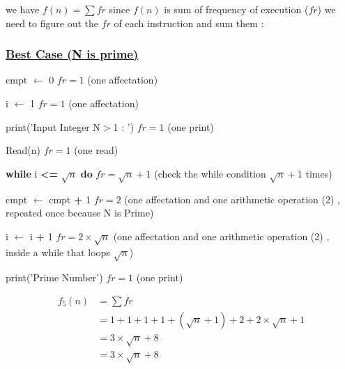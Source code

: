 we have \(f(n) = \sum fr\) since \(f(n)\) is sum of frequency of execution (\(fr\)) we need to figure out the
\(fr\) of each instruction and sum them : 

\subsubsection*{\underline{Best Case (N is prime)}}

\vspace{0.5cm}
cmpt $\gets$ 0  \hspace{4cm} \(fr = 1\) (one affectation)

\vspace{0.15cm}
i $\gets$ 1  \hspace{4.65cm} \(fr = 1\) (one affectation)

\vspace{0.15cm}
\textcolor{purplePlot!80!black}{print}(\textcolor{blueArea!60!black}{'Input Integer N\(>\)1 : '})  \hspace{0.95cm} \(fr = 1\) (one print)

\vspace{0.15cm}
\textcolor{purplePlot!80!black}{Read}(n)  \hspace{4.25cm} \(fr = 1\) (one read)

\vspace{0.15cm}

\textbf{while} i \textcolor{redPlot}{\textbf{\textless=}} \(\sqrt{n}\)  \textbf{do} \hspace{2.45cm} \(fr = \sqrt{n}+1\) (check the while condition \(\sqrt{n}+1\) times)


\vspace{0.15cm}
cmpt $\gets$ cmpt \textcolor{redPlot}{ \textbf{+}} 1 \hspace{2.6cm} \(fr = 2\) (one affectation and one arithmetic operation (2) , repeated once because N is Prime)

\vspace{0.15cm}
i $\gets$ i \textcolor{redPlot}{ \textbf{+}} 1 \hspace{3.95cm} \(fr = 2\times\sqrt{n}\) (one affectation and one arithmetic operation (2) , inside a while that loops \(\sqrt{n}\))

\vspace{0.15cm}

\textcolor{purplePlot!80!black}{print}(\textcolor{blueArea!60!black}{'Prime Number'}) \hspace{1.95cm} \(fr = 1\) (one print)

\vspace{0.75cm}
\begin{align*}
f_5(n) &= \sum fr \\
       &= 1 + 1 + 1 + 1 + (\sqrt{n}+1) + 2 + 2\times\sqrt{n} + 1 \\
     &= 3\times\sqrt{n} + 8 \\
     &= \boxed{3\times\sqrt{n} + 8}
\end{align*}

